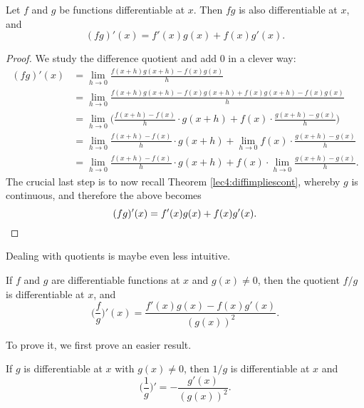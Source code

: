 \begin{theorem}
	Let $f$ and $g$ be functions differentiable at $x$.
	Then $f g$ is also differentiable at $x$, and
	\[
		(f g)'(x) = f'(x) g(x) + f(x) g'(x).
	\]
\end{theorem}

\begin{proof}
	We study the difference quotient and add $0$ in a clever way:
	\begin{align*}
		(f g)'(x) & = \lim_{h \to 0} \frac{f(x + h) g(x + h) - f(x) g(x)}{h}                                                         \\
		          & = \lim_{h \to 0} \frac{f(x + h) g(x + h) - f(x) g(x + h) + f(x) g(x + h) - f(x) g(x)}{h}                         \\
		          & = \lim_{h \to 0} \Big ( \frac{f(x + h) - f(x)}{h} \cdot g(x + h) + f(x) \cdot \frac{g(x + h) - g(x)}{h} \Big )   \\
		          & = \lim_{h \to 0} \frac{f(x + h) - f(x)}{h} \cdot g(x + h) + \lim_{h \to 0} f(x) \cdot \frac{g(x + h) - g(x)}{h}  \\
		          & = \lim_{h \to 0} \frac{f(x + h) - f(x)}{h} \cdot g(x + h) + f(x) \cdot \lim_{h \to 0} \frac{g(x + h) - g(x)}{h}.
	\end{align*}
	The crucial last step is to now recall Theorem \ref{lec4:diffimpliescont}, whereby $g$ is continuous, and therefore the above becomes
	\[
		(f g)'(x) = f'(x) g(x) + f(x) g'(x). \qedhere
	\]
\end{proof}

\noindent
Dealing with quotients is maybe even less intuitive.

\begin{theorem}
	If $f$ and $g$ are differentiable functions at $x$ and $g(x) \neq 0$, then the quotient $f / g$ is differentiable at $x$, and
	\[
		\Big ( \frac{f}{g} \Big )'(x) = \frac{f'(x) g(x) - f(x) g'(x)}{(g(x))^2}.
	\]
\end{theorem}

\noindent
To prove it, we first prove an easier result.

\begin{lemma}
	If $g$ is differentiable at $x$ with $g(x) \neq 0$, then $1 / g$ is differentiable at $x$ and
	\[
		\Big ( \frac{1}{g} \Big )' = -\frac{g'(x)}{(g(x))^2}.
	\]
\end{lemma}

